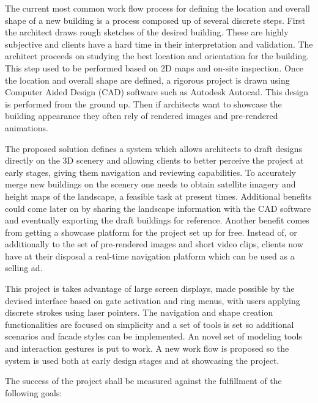 
The current most common work flow process for defining the location and overall shape
of a new building is a process composed up of several discrete steps.
First the architect draws rough sketches of the desired building.
These are highly subjective and clients have a hard time in their interpretation and validation.
The architect proceeds on studying the best location and orientation for the building.
This step used to be performed based on 2D maps and on-site inspection.
Once the location and overall shape are defined, a rigorous project is drawn using
Computer Aided Design (CAD) software such as Autodesk Autocad\cite{SITE-AUTOCAD}.
This design is performed from the ground up.
Then if architects want to showcase the building appearance they often rely of rendered images
and pre-rendered animations.



The proposed solution defines a system which allows architects to draft designs
directly on the 3D scenery and allowing clients to better perceive the project at early stages,
giving them navigation and reviewing capabilities.
To accurately merge new buildings on the scenery one needs to obtain
satellite imagery and height maps of the landscape, a feasible task at present times.
Additional benefits could come later on by sharing the landscape information with the CAD
software and eventually exporting the draft buildings for reference.
Another benefit comes from getting a showcase platform for the project set up for free.
Instead of, or additionally to the set of pre-rendered images and short video clips,
clients now have at their disposal a real-time navigation platform which can be used
as a selling ad.



This project is takes advantage of large screen displays,
made possible by the devised interface based on gate activation and ring menus,
with users applying discrete strokes using laser pointers.
The navigation and shape creation functionalities are focused on simplicity and a set
of tools is set so additional scenarios and facade styles can be implemented.
An novel set of modeling tools and interaction gestures is put to work.
A new work flow is proposed so the system is used both at early design stages and
at showcasing the project.

The success of the project shall be measured against the fulfillment of the following goals:


